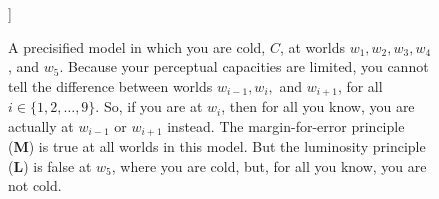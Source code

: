 \documentclass[landscape, two column, full page,leqno]{article}
\newcommand{\tbf}{\textbf}
\begin{document}
\begin{figure}[t]
{
\caption{{\small A precisified model in which you are cold, $C$, at worlds $w_1, w_2, w_3, w_4$, and $w_5$.  Because your perceptual capacities are limited, you cannot tell the difference between worlds $w_{i-1}, w_i,$ and $w_{i+1}$, for all $i \in \{ 1, 2, \dots, 9 \}$.  So, if you are at $w_i$, then for all you know, you are actually at $w_{i-1}$ or $w_{i+1}$ instead.   The margin-for-error principle (\tbf{M}) is true at all worlds in this model.  But the luminosity principle (\tbf{L}) is false at $w_5$, where you are cold, but, for all you know, you are not cold. \label{fig1}}}
\vspace{20pt}
}]
\end{figure}
\end{document}
